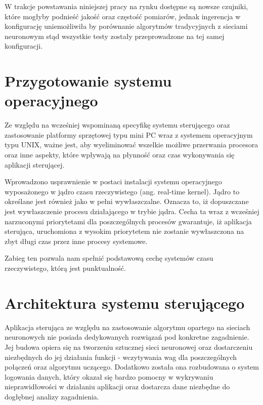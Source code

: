 W trakcje powstawania niniejszej pracy na rynku dostępne są nowsze czujniki, które mogłyby podnieść jakość oraz częstość pomiarów, jednak ingerencja w konfigurację uniemożliwiła by porównanie algorytmów tradycyjnych z sieciami neuronowym stąd wszystkie testy zostały przeprowadzone na tej samej konfiguracji.




\section{Przygotowanie systemu operacyjnego}
Ze względu na wcześniej wspominaną specyfikę systemu sterującego oraz zastosowanie platformy sprzętowej typu mini PC wraz z systemem operacyjnym typu UNIX, ważne jest, aby wyeliminować wszelkie możliwe przerwania procesora oraz inne aspekty, które wpływają na płynność oraz czas wykonywania się aplikacji sterującej.

Wprowadzono usprawnienie w postaci instalacji systemu operacyjnego wyposażonego w jądro czasu rzeczywistego (ang. real-time kernel). Jądro to określane jest również jako w pełni wywłaszczalne. Oznacza to, iż dopuszczane jest wywłaszczenie procesu działającego w trybie jądra. Cecha ta wraz z wcześniej narzuconymi priorytetami dla poszczególnych procesów gwarantuje, iż aplikacja sterująca, uruchomiona z wysokim priorytetem nie zostanie wywłaszczona na zbyt długi czas przez inne procesy systemowe.


Zabieg ten pozwala nam spełnić podstawową cechę systemów czasu rzeczywistego, którą jest punktualność.



\section{Architektura systemu sterującego}

Aplikacja sterująca ze względu na zastosowanie algorytmu opartego na sieciach neuronowych nie posiada dedykowanych rozwiązań pod konkretne zagadnienie. Jej budowa opiera się na tworzeniu sztucznej sieci neuronowej oraz dostarczeniu niezbędnych do jej działania funkcji - wczytywania wag dla poszczególnych połączeń oraz algorytmu uczącego. Dodatkowo została ona rozbudowana o system logowania danych, który okazał się bardzo pomocny w wykrywaniu nieprawidłowości w działaniu aplikacji oraz dostarcza dane niezbędne do dogłębnej analizy zagadnienia.


